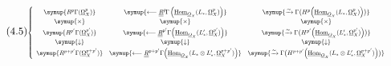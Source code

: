 \begin{equation}\tag{4.5}
\resizebox{\textwidth}{!}{$
\left\{\begin{array}{ccc}\symup{R^{p}\Gamma(\underline{\Omega}_X^{p})}&\symup{\longleftarrow
\underline{\underline{R}}^{p}\!\Gamma\left(\Homsh_{\Osh_X}(L_{*},\underline{\Omega}_X^{p})\right)}&\symup{\xrightarrow{\sim}
\Gamma\bigl(H^{p}\!\left(\Homsh_{\Osh_X}(L_{*},\underline{\Omega}_X^{p})\right)\bigr)}\\[3pt]\symup{\times}&\symup{\times}&\symup{\times}\\[3pt]\symup{R^{p'}\Gamma(\underline{\Omega}_X^{p'})}&\symup{\longleftarrow
\underline{\underline{R}}^{p'}\Gamma\!\left(\Homsh_{\Osh_X}(L'_{*},\underline{\Omega}_X^{p'})\right)}&\symup{\xrightarrow{\sim}
\Gamma\bigl(H^{p'}\!\left(\Homsh_{\Osh_X}(L'_{*},\underline{\Omega}_X^{p'})\right)\bigr)}\\[3pt]\symup{\downarrow}&\symup{\downarrow}&\symup{\downarrow}\\[3pt]\symup{R^{p+p'}\Gamma(\underline{\Omega}_X^{p+p'})}&\symup{\longleftarrow
\underline{\underline{R}}^{p+p'}\Gamma\!\left(
\Homsh_{\Osh_X}(L_{*}\otimes L'_{*},\underline{\Omega}_X^{p+p'})\right)}&\symup{\xrightarrow{\sim}
\Gamma\bigl(H^{p+p'}\!\left(
\Homsh_{\Osh_X}(L_{*}\otimes L'_{*},\underline{\Omega}_X^{p+p'})\right)\bigr)}\end{array}\right.
$}
\end{equation}

